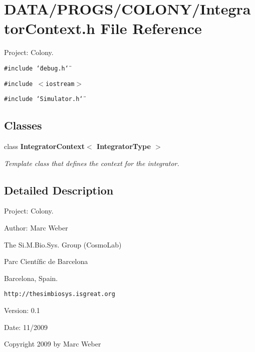 \section{DATA/PROGS/COLONY/IntegratorContext.h File Reference}
\label{IntegratorContext_8h}
Project: Colony. 

{\tt \#include \char`\"{}debug.h\char`\"{}}\par
{\tt \#include $<$iostream$>$}\par
{\tt \#include \char`\"{}Simulator.h\char`\"{}}\par
\subsection*{Classes}
\begin{CompactItemize}
\item 
class {\bf IntegratorContext$<$ IntegratorType $>$}
\begin{CompactList}\small\item\em Template class that defines the context for the integrator. \item\end{CompactList}\end{CompactItemize}


\subsection{Detailed Description}
Project: Colony. 

\begin{Desc}
\item[Author:]Marc Weber\par
 The Si.M.Bio.Sys. Group (CosmoLab)\par
 Parc Científic de Barcelona\par
 Barcelona, Spain.\par
 {\tt http://thesimbiosys.isgreat.org} \end{Desc}
\begin{Desc}
\item[Version:]0.1 \end{Desc}
\begin{Desc}
\item[Date:]11/2009\end{Desc}
Copyright 2009 by Marc Weber 